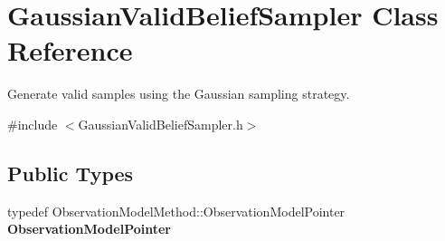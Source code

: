 \hypertarget{class_gaussian_valid_belief_sampler}{\section{\-Gaussian\-Valid\-Belief\-Sampler \-Class \-Reference}
\label{class_gaussian_valid_belief_sampler}
}


\-Generate valid samples using the \-Gaussian sampling strategy.  




{\ttfamily \#include $<$\-Gaussian\-Valid\-Belief\-Sampler.\-h$>$}

\subsection*{\-Public \-Types}
\begin{DoxyCompactItemize}
\item 
\hypertarget{class_gaussian_valid_belief_sampler_a61a22b17254765f0c32940bb1d118473}{typedef \*
\-Observation\-Model\-Method\-::\-Observation\-Model\-Pointer {\bfseries \-Observation\-Model\-Pointer}}\label{class_gaussian_valid_belief_sampler_a61a22b17254765f0c32940bb1d118473}

\end{DoxyCompactItemize}
